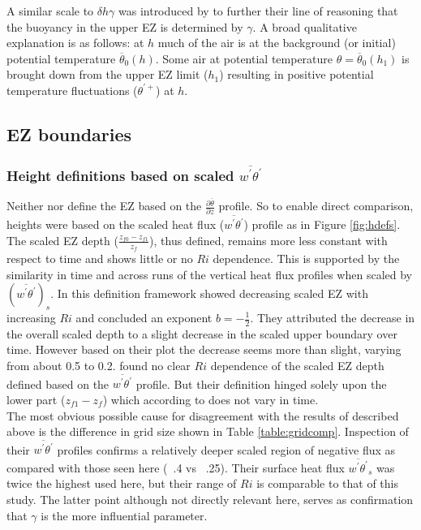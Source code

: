 A similar scale to $\delta h \gamma$ was introduced by \cite{GarciaMellado} to further their line of reasoning that the buoyancy in the upper EZ is determined by $\gamma$. A broad qualitative explanation is as follows: at $h$ much of the air is at the background (or initial) potential temperature $\overline{\theta}_{0}(h)$.  Some air at potential temperature $\theta = \overline{\theta}_{0}(h_{1})$ is brought down from the upper EZ limit ($h_{1}$) resulting in positive potential temperature fluctuations ($\theta^{'+}$) at $h$.\\

\subsection{EZ boundaries}

\subsubsection{Height definitions based on scaled $\overline{w^{'}\theta^{'}}$}
Neither \cite{FedConzMir04} nor \cite{GarciaMellado} define the EZ based on the $\frac{\partial \overline{\theta}}{\partial z}$ profile.  So to enable direct comparison, heights were based on the scaled heat flux ($\overline{w^{'}\theta^{'}}$) profile as in Figure \ref{fig:hdefs}. The scaled EZ depth ($\frac{z_{f0}-z_{f1}}{z_{f}}$), thus defined, remains more less constant with respect to time and shows little or no $Ri$ dependence.  This is supported by the similarity in time and across runs of the vertical heat flux profiles when scaled by $(\overline{w^{'}\theta^{'}})_{s}$.  In this definition framework \cite{FedConzMir04} showed decreasing scaled EZ with increasing $Ri$ and concluded an exponent $b = -\frac{1}{2}$.  They attributed the decrease in the overall scaled depth to a slight decrease in the scaled upper boundary over time.  However based on their plot the decrease seems more than slight, varying from about 0.5 to 0.2.  \cite{BrooksFowler2} found no clear $Ri$ dependence of the scaled EZ depth defined based on the $\overline{w^{'}\theta^{'}}$ profile.  But their definition hinged solely upon the lower part ($z_{f1} - z_{f}$) which according to \cite{FedConzMir04} does not vary in time.\\

The most obvious possible cause for disagreement with the results of \cite{FedConzMir04} described above is the difference in grid size shown in Table \ref{table:gridcomp}.  Inspection of their $\overline{w^{'}\theta^{'}}$ profiles confirms a relatively deeper scaled region of negative flux as compared with those seen here (~.4 vs ~.25). Their surface heat flux $\overline{w^{'}\theta^{'}}_{s}$ was twice the highest used here, but their range of $Ri$ is comparable to that of this study.  The latter point although not directly relevant here, serves as confirmation that $\gamma$ is the more influential parameter.\\

